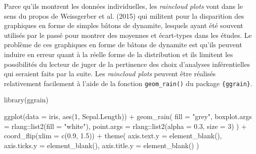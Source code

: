 \documentclass[
  letterpaper,
]{book}
\newenvironment{Shaded}{\begin{snugshade}}{\end{snugshade}}
\newcommand{\AttributeTok}[1]{\textcolor[rgb]{0.40,0.45,0.13}{#1}}
\newcommand{\DecValTok}[1]{\textcolor[rgb]{0.68,0.00,0.00}{#1}}
\newcommand{\FloatTok}[1]{\textcolor[rgb]{0.68,0.00,0.00}{#1}}
\newcommand{\FunctionTok}[1]{\textcolor[rgb]{0.28,0.35,0.67}{#1}}
\newcommand{\NormalTok}[1]{\textcolor[rgb]{0.00,0.23,0.31}{#1}}
\newcommand{\SpecialCharTok}[1]{\textcolor[rgb]{0.37,0.37,0.37}{#1}}
\newcommand{\StringTok}[1]{\textcolor[rgb]{0.13,0.47,0.30}{#1}}
\begin{document}
Parce qu'ils montrent les données individuelles, les \emph{raincloud
plots} vont dans le sens du propos de Weissgerber et al. (2015) qui
militent pour la disparition des graphiques en forme de simples bâtons
de dynamite, lesquels ayant été souvent utilisés par le passé pour
montrer des moyennes et écart-types dans les études. Le problème de ces
graphiques en forme de bâtons de dynamite est qu'ils peuvent induire en
erreur quant à la réelle forme de la distribution et ils limitent les
possibilités du lecteur de juger de la pertinence des choix d'analyses
inférentielles qui seraient faits par la suite. Les \emph{raincloud
plots} peuvent être réalisés relativement facilement à l'aide de la
fonction \texttt{geom\_rain()} du package \texttt{\{ggrain\}}.

\begin{Shaded}
\begin{Highlighting}[]
\FunctionTok{library}\NormalTok{(ggrain)}

\FunctionTok{ggplot}\NormalTok{(}\AttributeTok{data =}\NormalTok{ iris, }\FunctionTok{aes}\NormalTok{(}\DecValTok{1}\NormalTok{, Sepal.Length)) }\SpecialCharTok{+}
  \FunctionTok{geom\_rain}\NormalTok{(}
    \AttributeTok{fill =} \StringTok{"grey"}\NormalTok{,}
    \AttributeTok{boxplot.args =}\NormalTok{  rlang}\SpecialCharTok{::}\FunctionTok{list2}\NormalTok{(}\AttributeTok{fill =} \StringTok{"white"}\NormalTok{),}
    \AttributeTok{point.args =}\NormalTok{ rlang}\SpecialCharTok{::}\FunctionTok{list2}\NormalTok{(}\AttributeTok{alpha =} \FloatTok{0.3}\NormalTok{, }\AttributeTok{size =} \DecValTok{3}\NormalTok{)}
\NormalTok{  ) }\SpecialCharTok{+}
  \FunctionTok{coord\_flip}\NormalTok{(}\AttributeTok{xlim =} \FunctionTok{c}\NormalTok{(}\FloatTok{0.9}\NormalTok{, }\FloatTok{1.5}\NormalTok{)) }\SpecialCharTok{+}
  \FunctionTok{theme}\NormalTok{(}
    \AttributeTok{axis.text.y =} \FunctionTok{element\_blank}\NormalTok{(),}
    \AttributeTok{axis.ticks.y =} \FunctionTok{element\_blank}\NormalTok{(),}
    \AttributeTok{axis.title.y =} \FunctionTok{element\_blank}\NormalTok{()}
\NormalTok{  )}
\end{Highlighting}
\end{Shaded}
\end{document}
